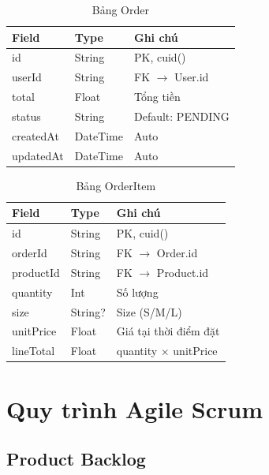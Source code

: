 \documentclass[12pt,a4paper]{article}
\begin{document}
\begin{table}[H]
\centering
\caption{Bảng Order}
\begin{tabular}{lll}
\toprule
\textbf{Field} & \textbf{Type} & \textbf{Ghi chú} \\
\midrule
id        & String   & PK, cuid() \\
userId    & String   & FK $\to$ User.id \\
total     & Float    & Tổng tiền \\
status    & String   & Default: PENDING \\
createdAt & DateTime & Auto \\
updatedAt & DateTime & Auto \\
\bottomrule
\end{tabular}
\end{table}

\begin{table}[H]
\centering
\caption{Bảng OrderItem}
\begin{tabular}{lll}
\toprule
\textbf{Field} & \textbf{Type} & \textbf{Ghi chú} \\
\midrule
id        & String   & PK, cuid() \\
orderId   & String   & FK $\to$ Order.id \\
productId & String   & FK $\to$ Product.id \\
quantity  & Int      & Số lượng \\
size      & String?  & Size (S/M/L) \\
unitPrice & Float    & Giá tại thời điểm đặt \\
lineTotal & Float    & quantity $\times$ unitPrice \\
\bottomrule
\end{tabular}
\end{table}

\section{Quy trình Agile Scrum}

\subsection{Product Backlog}
\end{document}

